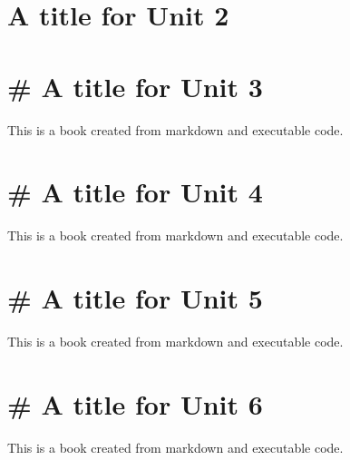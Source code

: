 \documentclass[
  letterpaper,
  DIV=11,
  numbers=noendperiod]{scrreprt}
\begin{document}

\chapter{A title for Unit 2}\label{a-title-for-unit-2}


\chapter{\# A title for Unit 3}\label{a-title-for-unit-3}

This is a book created from markdown and executable code.


\chapter{\# A title for Unit 4}\label{a-title-for-unit-4}

This is a book created from markdown and executable code.


\chapter{\# A title for Unit 5}\label{a-title-for-unit-5}

This is a book created from markdown and executable code.


\chapter{\# A title for Unit 6}\label{a-title-for-unit-6}

This is a book created from markdown and executable code.
\end{document}
